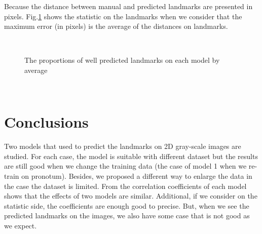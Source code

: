 \documentclass[12pt,a4paper]{article}
\begin{document}
Because the distance between manual and predicted landmarks are presented in pixels. Fig.\ref{expr22avg} shows the statistic on the landmarks when we consider that the maximum error (in pixels) is the average of the distances on landmarks.
\begin{figure}[h!]
\centering
{}~~
\caption{The proportions of well predicted landmarks on each model by average}
\label{expr22avg}
\end{figure}~\\
\section{Conclusions}
Two models that used to predict the landmarks on 2D gray-scale images are studied. For each case, the model is suitable with different dataset but the results are still good when we change the training data (the case of model 1 when we re-train on pronotum). Besides, we proposed a different way to enlarge the data in the case the dataset is limited. From the correlation coefficients of each model shows that the effects of two models are similar. Additional, if we consider on the statistic side, the coefficients are enough good to precise. But, when we see the predicted landmarks on the images, we also have some case that is not good as we expect. 


\pagebreak
\appendix
\end{document}
